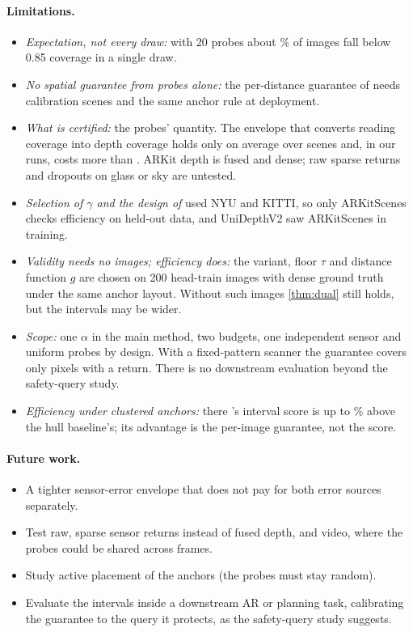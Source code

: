 \paragraph{Limitations.}
\begin{itemize}[leftmargin=*,itemsep=1pt,topsep=2pt]
\item \emph{Expectation, not every draw:} with 20 probes about \NumBetaShortOneTwenty\% of images fall below 0.85 coverage in a single draw.
\item \emph{No spatial guarantee from probes alone:} the per-distance guarantee of \mDualBoth needs calibration scenes and the same anchor rule at deployment.
\item \emph{What is certified:} the probes' quantity.
The envelope that converts reading coverage into depth coverage holds only on average over scenes and, in our runs, costs more than \mDistBoth.
ARKit depth is fused and dense; raw sparse returns and dropouts on glass or sky are untested.
\item \emph{Selection of $\gamma$ and the design of \mDist} used NYU and KITTI, so only ARKitScenes checks efficiency on held-out data, and UniDepthV2 saw ARKitScenes in training.
\item \emph{Validity needs no images; efficiency does:} the \mDist variant, floor $\tau$ and distance function $g$ are chosen on 200 head-train images with dense ground truth under the same anchor layout. Without such images \cref{thm:dual} still holds, but the intervals may be wider.
\item \emph{Scope:} one $\alpha$ in the main method, two budgets, one independent sensor and uniform probes by design.
With a fixed-pattern scanner the guarantee covers only pixels with a return.
There is no downstream evaluation beyond the safety-query study.
\item \emph{Efficiency under clustered anchors:} there \mDual's interval score is up to \NumDualISLoseMax\% above the hull baseline's; its advantage is the per-image guarantee, not the score.
\end{itemize}

\paragraph{Future work.}
\begin{itemize}[leftmargin=*,itemsep=1pt,topsep=2pt]
\item A tighter sensor-error envelope that does not pay for both error sources separately.
\item Test raw, sparse sensor returns instead of fused depth, and video, where the probes could be shared across frames.
\item Study active placement of the anchors (the probes must stay random).
\item Evaluate the intervals inside a downstream AR or planning task, calibrating the guarantee to the query it protects, as the safety-query study suggests.
\end{itemize}
